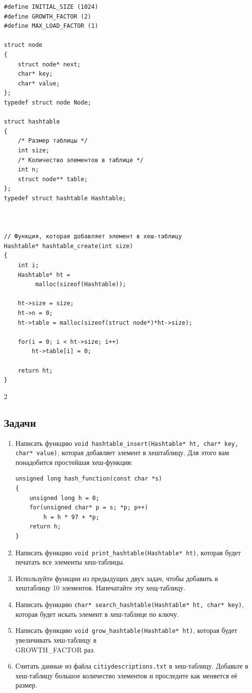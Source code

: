 \documentclass{article}
\begin{document}
\begin{multicols}{2}
\begin{lstlisting}
#define INITIAL_SIZE (1024)
#define GROWTH_FACTOR (2)
#define MAX_LOAD_FACTOR (1)

struct node 
{
    struct node* next;
    char* key;
    char* value;
};
typedef struct node Node;

struct hashtable 
{
    /* Размер таблицы */
    int size;      
    /* Количество элементов в таблице */     
    int n;              
    struct node** table;
};
typedef struct hashtable Hashtable;



// Функция, которая добавляет элемент в хеш-таблицу
Hashtable* hashtable_create(int size)
{
    int i;
    Hashtable* ht = 
         malloc(sizeof(Hashtable));

    ht->size = size;
    ht->n = 0;
    ht->table = malloc(sizeof(struct node*)*ht->size);

    for(i = 0; i < ht->size; i++) 
        ht->table[i] = 0;

    return ht;
}
\end{lstlisting}
\end{multicols}{2}


\subsection*{Задачи}
\begin{enumerate}
\item Написать функцию \texttt{void hashtable\_insert(Hashtable* ht, char* key, char* value)}, которая добавляет элемент в хештаблицу. Для этого вам понадобится простейшая хеш-функция:
\begin{lstlisting}
unsigned long hash_function(const char *s)
{
    unsigned long h = 0;
    for(unsigned char* p = s; *p; p++)
        h = h * 97 + *p;
    return h;
}
\end{lstlisting}

\item Написать функцию \texttt{void print\_hashtable(Hashtable* ht)}, которая будет печатать все элементы хеш-таблицы.

\item Используйте функции из предыдущих двух задач, чтобы добавить в хештаблицу 10 элементов. Напечатайте эту хещ-таблицу.

\item Написать функцию \texttt{char* search\_hashtable(Hashtable* ht, char* key)}, которая будет искать элемент в хеш-таблице по ключу.

\item Написать функцию \texttt{void grow\_hashtable(Hashtable* ht)}, которая будет увеличивать хеш-таблицу в\\ GROWTH\_FACTOR раз.

\item Считать данные из файла \texttt{citiydescriptions.txt} в хеш-таблицу. Добавьте в хеш-таблицу большое количество элементов и проследите как меняется её размер. 

\end{enumerate}
\end{document}
